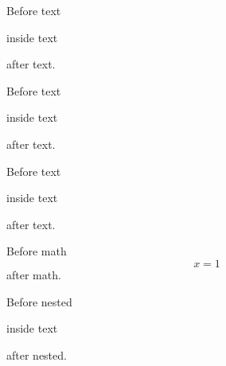 Before text
\begin{note}
  inside text
\end{note}
after text.

Before text
\begin{note}
  inside text
\end{note}
after text.

Before text
\begin{note}
  inside text
\end{note}%
after text.

Before math
\begin{equation}
  x = 1
\end{equation}
after math.

\begin{outer}
  Before nested
  \begin{inner}
    inside text
  \end{inner}
  after nested.
\end{outer}
